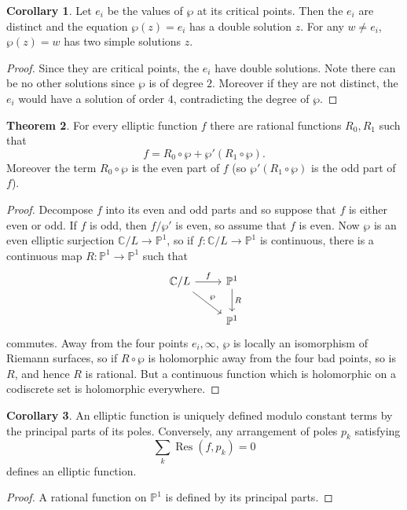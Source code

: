 \documentclass[12pt]{report}
\newcommand{\CC}{\mathbb{C}}
\newcommand{\PP}{\mathbb{P}}
\newcommand{\Res}{\operatorname{Res}}
\theoremstyle{definition}
\newtheorem{theorem}{Theorem}[chapter]
\newtheorem{corollary}[theorem]{Corollary}
\begin{document}
\begin{corollary}
Let $e_i$ be the values of $\wp$ at its critical points. Then the $e_i$ are distinct and the equation $\wp(z) = e_i$ has a double solution $z$.
For any $w \neq e_i$, $\wp(z) = w$ has two simple solutions $z$.
\end{corollary}
\begin{proof}
Since they are critical points, the $e_i$ have double solutions. Note there can be no other solutions since $\wp$ is of degree $2$.
Moreover if they are not distinct, the $e_i$ would have a solution of order $4$, contradicting the degree of $\wp$.
\end{proof}
\begin{theorem}
For every elliptic function $f$ there are rational functions $R_0,R_1$ such that
$$f = R_0 \circ \wp + \wp' (R_1 \circ \wp).$$
Moreover the term $R_0 \circ \wp$ is the even part of $f$ (so $\wp'(R_1 \circ \wp)$ is the odd part of $f$).
\end{theorem}
\begin{proof}
Decompose $f$ into its even and odd parts and so suppose that $f$ is either even or odd. If $f$ is odd, then $f/\wp'$ is even, so assume that $f$ is even.
Now $\wp$ is an even elliptic surjection $\CC/L \to \PP^1$, so if $f: \CC/L \to \PP^1$ is continuous, there is a continuous map $R: \PP^1 \to \PP^1$ such that
$$\begin{tikzcd}
\CC/L \arrow[r,"f"] \arrow[dr,"\wp"] & \PP^1 \arrow[d,"R"] \\
&\PP^1
\end{tikzcd}$$
commutes. Away from the four points $e_i,\infty$, $\wp$ is locally an isomorphism of Riemann surfaces, so if $R \circ \wp$ is holomorphic away from the four bad points, so is $R$, and hence $R$ is rational.
But a continuous function which is holomorphic on a codiscrete set is holomorphic everywhere.
\end{proof}
\begin{corollary}
An elliptic function is uniquely defined modulo constant terms by the principal parts of its poles. Conversely, any arrangement of poles $p_k$ satisfying
$$\sum_k \Res(f, p_k) = 0$$
defines an elliptic function.
\end{corollary}
\begin{proof}
A rational function on $\PP^1$ is defined by its principal parts.
\end{proof}
\end{document}
